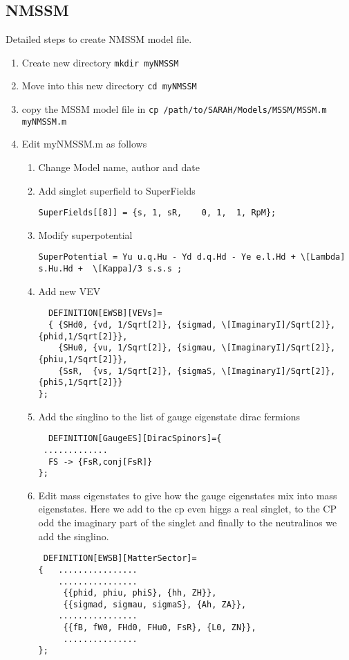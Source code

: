 \documentclass[final,3p,times,pdflatex]{elsarticle}
\newcommand{\code}[1]{\lstinline|#1|}  %
\begin{document}
\subsection{NMSSM}
Detailed steps to create NMSSM model file.
\begin{enumerate}
\item Create new directory \code{mkdir myNMSSM}
\item Move into this new directory \code{cd myNMSSM}
\item copy the MSSM model file in \code{cp /path/to/SARAH/Models/MSSM/MSSM.m  myNMSSM.m}
\item Edit myNMSSM.m as follows
\begin{enumerate}
\item  Change Model name, author and date
\item Add singlet superfield to SuperFields
\begin{lstlisting}
SuperFields[[8]] = {s, 1, sR,    0, 1,  1, RpM};
\end{lstlisting}
\item Modify superpotential
\begin{lstlisting}
SuperPotential = Yu u.q.Hu - Yd d.q.Hd - Ye e.l.Hd + \[Lambda] s.Hu.Hd +  \[Kappa]/3 s.s.s ;
\end{lstlisting}
\item Add new VEV
\begin{lstlisting} 
  DEFINITION[EWSB][VEVs]= 
  { {SHd0, {vd, 1/Sqrt[2]}, {sigmad, \[ImaginaryI]/Sqrt[2]},{phid,1/Sqrt[2]}},
    {SHu0, {vu, 1/Sqrt[2]}, {sigmau, \[ImaginaryI]/Sqrt[2]},{phiu,1/Sqrt[2]}},
    {SsR,  {vs, 1/Sqrt[2]}, {sigmaS, \[ImaginaryI]/Sqrt[2]},{phiS,1/Sqrt[2]}}
};
\end{lstlisting}
\item  Add the singlino to the list of gauge eigenstate dirac fermions
\begin{lstlisting}
  DEFINITION[GaugeES][DiracSpinors]={
 .............
  FS -> {FsR,conj[FsR]}   
};
\end{lstlisting}
\item Edit mass eigenstates to give how the gauge eigenstates mix into mass eigenstates.  Here we add to the cp even higgs a real singlet, to the CP odd the imaginary part of the singlet and finally to the neutralinos we add the singlino.

\begin{lstlisting}
 DEFINITION[EWSB][MatterSector]= 
{   ................
    ................
     {{phid, phiu, phiS}, {hh, ZH}},      
     {{sigmad, sigmau, sigmaS}, {Ah, ZA}},
    ................
     {{fB, fW0, FHd0, FHu0, FsR}, {L0, ZN}},
     ...............
}; 


\end{lstlisting}
\end{enumerate}
\end{enumerate}
\end{document}
